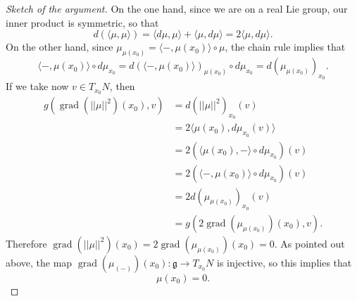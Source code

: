 \documentclass[A4paper, 12pt, british, reqno]{amsart}
\DeclareMathOperator{\grad}{grad}
\newcommand{\g}{\mathfrak{g}}
\newcommand{\1}{\mathbbm{1}}
\begin{document}
\begin{metalm}
\begin{proof}[Sketch of the argument]
	On the one hand, since we are on a real Lie group, our inner product is symmetric, so that
	\[ d(\langle\mu,\mu\rangle)=\langle d\mu,\mu\rangle+\langle \mu,d\mu\rangle=2\langle \mu,d\mu\rangle. \]
	On the other hand, since $\mu_{\mu(x_{0})}=\langle -,\mu(x_{0})\rangle\circ \mu$, the chain rule implies that
	\[ \langle -,\mu(x_{0})\rangle\circ d\mu_{x_{0}}=d(\langle-,\mu(x_{0})\rangle)_{\mu(x_{0})}\circ d\mu_{x_{0}}=d(\mu_{\mu(x_{0})})_{x_{0}}. \]
	If we take now $v\in T_{x_{0}}N$, then
	\begin{align*}
	    g(\grad(||\mu||^{2})(x_{0}),v) & =d(||\mu||^{2})_{x_{0}}(v) \\
	    & =2\langle \mu(x_{0}),d\mu_{x_{0}}(v)\rangle \\
	    & =2(\langle \mu(x_{0}),-\rangle \circ d\mu_{x_{0}})(v) \\
	    & =2(\langle-, \mu(x_{0})\rangle \circ d\mu_{x_{0}})(v) \\
	    & =2d(\mu_{\mu(x_{0})})_{x_{0}}(v) \\
	    & =g(2\grad(\mu_{\mu(x_{0})})(x_{0}),v). 
	\end{align*}
	Therefore $\grad(||\mu||^{2})(x_{0})=2\grad(\mu_{\mu(x_{0})})(x_{0})=0$.
	As pointed out above, the map $\grad(\mu_{(-)})(x_{0})\colon \g\to T_{x_{0}}N$ is injective, so this implies that
	\[ \mu(x_{0})=0. \]
    \end{proof}
\end{metalm}
\end{document}
